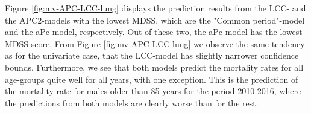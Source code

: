 Figure \ref{fig:mv-APC-LCC-lung} displays the prediction results from the LCC- and the APC2-models with the lowest MDSS, which are the "Common period"-model and the aPc-model, respectively. Out of these two, the aPc-model has the lowest MDSS score. From Figure \ref{fig:mv-APC-LCC-lung} we observe the same tendency as for the univariate case, that the LCC-model has slightly narrower confidence bounds. Furthermore, we see that both models predict the mortality rates for all age-groups quite well for all years, with one exception. This is the prediction of the mortality rate for males older than 85 years for the period 2010-2016, where the predictions from both models are clearly worse than for the rest.